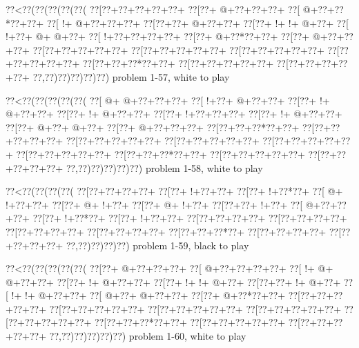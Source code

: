 \vbox{\vbox{\goo
\0??<\0??(\0??(\0??(\0??(\0??(
\0??[\0??+\0??+\0??+\0??+\0??+
\0??[\0??+\- @+\0??+\0??+\0??+
\0??[\- @+\0??+\0??*\0??+\0??+
\0??[\- !+\- @+\0??+\0??+\0??+
\0??[\0??+\0??+\- @+\0??+\0??+
\0??[\0??+\- !+\- !+\- @+\0??+
\0??[\- !+\0??+\- @+\- @+\0??+
\0??[\- !+\0??+\0??+\0??+\0??+
\0??[\0??+\- @+\0??*\0??+\0??+
\0??[\0??+\- @+\0??+\0??+\0??+
\0??[\0??+\0??+\0??+\0??+\0??+
\0??[\0??+\0??+\0??+\0??+\0??+
\0??[\0??+\0??+\0??+\0??+\0??+
\0??[\0??+\0??+\0??+\0??+\0??+
\0??[\0??+\0??+\0??*\0??+\0??+
\0??[\0??+\0??+\0??+\0??+\0??+
\0??[\0??+\0??+\0??+\0??+\0??+
\0??,\0??)\0??)\0??)\0??)\0??)
}
\hfil problem 1-57, white to play\hfil\break
}

\vbox{\vbox{\goo
\0??<\0??(\0??(\0??(\0??(\0??(
\0??[\- @+\- @+\0??+\0??+\0??+
\0??[\- !+\0??+\- @+\0??+\0??+
\0??[\0??+\- !+\- @+\0??+\0??+
\0??[\0??+\- !+\- @+\0??+\0??+
\0??[\0??+\- !+\0??+\0??+\0??+
\0??[\0??+\- !+\- @+\0??+\0??+
\0??[\0??+\- @+\0??+\- @+\0??+
\0??[\0??+\- @+\0??+\0??+\0??+
\0??[\0??+\0??+\0??*\0??+\0??+
\0??[\0??+\0??+\0??+\0??+\0??+
\0??[\0??+\0??+\0??+\0??+\0??+
\0??[\0??+\0??+\0??+\0??+\0??+
\0??[\0??+\0??+\0??+\0??+\0??+
\0??[\0??+\0??+\0??+\0??+\0??+
\0??[\0??+\0??+\0??*\0??+\0??+
\0??[\0??+\0??+\0??+\0??+\0??+
\0??[\0??+\0??+\0??+\0??+\0??+
\0??,\0??)\0??)\0??)\0??)\0??)
}
\hfil problem 1-58, white to play\hfil\break
}

\vbox{\vbox{\goo
\0??<\0??(\0??(\0??(\0??(
\0??[\0??+\0??+\0??+\0??+
\0??[\0??+\- !+\0??+\0??+
\0??[\0??+\- !+\0??*\0??+
\0??[\- @+\- !+\0??+\0??+
\0??[\0??+\- @+\- !+\0??+
\0??[\0??+\- @+\- !+\0??+
\0??[\0??+\0??+\- !+\0??+
\0??[\- @+\0??+\0??+\0??+
\0??[\0??+\- !+\0??*\0??+
\0??[\0??+\- !+\0??+\0??+
\0??[\0??+\0??+\0??+\0??+
\0??[\0??+\0??+\0??+\0??+
\0??[\0??+\0??+\0??+\0??+
\0??[\0??+\0??+\0??+\0??+
\0??[\0??+\0??+\0??*\0??+
\0??[\0??+\0??+\0??+\0??+
\0??[\0??+\0??+\0??+\0??+
\0??,\0??)\0??)\0??)\0??)
}
\hfil problem 1-59, black to play\hfil\break
}

\vbox{\vbox{\goo
\0??<\0??(\0??(\0??(\0??(\0??(
\0??[\0??+\- @+\0??+\0??+\0??+
\0??[\- @+\0??+\0??+\0??+\0??+
\0??[\- !+\- @+\- @+\0??+\0??+
\0??[\0??+\- !+\- @+\0??+\0??+
\0??[\0??+\- !+\- !+\- @+\0??+
\0??[\0??+\0??+\- !+\- @+\0??+
\0??[\- !+\- !+\- @+\0??+\0??+
\0??[\- @+\0??+\- @+\0??+\0??+
\0??[\0??+\- @+\0??*\0??+\0??+
\0??[\0??+\0??+\0??+\0??+\0??+
\0??[\0??+\0??+\0??+\0??+\0??+
\0??[\0??+\0??+\0??+\0??+\0??+
\0??[\0??+\0??+\0??+\0??+\0??+
\0??[\0??+\0??+\0??+\0??+\0??+
\0??[\0??+\0??+\0??*\0??+\0??+
\0??[\0??+\0??+\0??+\0??+\0??+
\0??[\0??+\0??+\0??+\0??+\0??+
\0??,\0??)\0??)\0??)\0??)\0??)
}
\hfil problem 1-60, white to play\hfil\break
}

